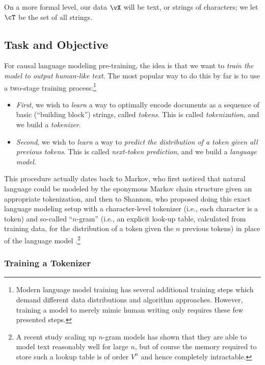 \documentclass[../../book-main.tex]{subfiles}
\begin{document}
On a more formal level, our data \(\vX\) will be text, or strings of
characters; we let \(\cT\) be the set of all strings.

\subsection{Task and Objective} \label{sub:clm_text_objective}

For causal language modeling pre-training, the idea is that we want
to \textit{train the model to output human-like text}. The most
popular way to do this by far is to use a two-stage training
process:\footnote{Modern language model training has several
additional training steps which demand different data distributions
and algorithm approaches. However, training a model to merely mimic
human writing only requires these few presented steps.}
\begin{itemize}
\item \textit{First}, we wish to \textit{learn} a way to optimally
encode documents as a sequence of basic (``building block'')
strings, called \textit{tokens}. This is called
\textit{tokenization}, and we build a \textit{tokenizer}.
\item \textit{Second}, we wish to \textit{learn} a way to
\textit{predict the distribution of a token given all previous
tokens}. This is called \textit{next-token prediction}, and we
build a \textit{language model}.
\end{itemize}
This procedure actually dates back to Markov, who first noticed that
natural language could be modeled by the eponymous Markov chain
structure \citep{markov2006example} given an appropriate
tokenization, and then to Shannon, who proposed doing this exact
language modeling setup with a character-level tokenizer (i.e., each
character is a token) and so-called ``\(n\)-gram'' (i.e., an explicit
look-up table, calculated from training data, for the distribution of
a token given the \(n\) previous tokens) in place of the language
model \citep{Shannon-1948}.\footnote{A recent study
\citep{liu2024infini} scaling up \(n\)-gram models has shown that
they are able to model text reasonably well for large \(n\), but of
course the memory required to store such a lookup table is of order
\(V^{n}\) and hence completely intractable.}

\subsubsection{Training a Tokenizer}
\end{document}
